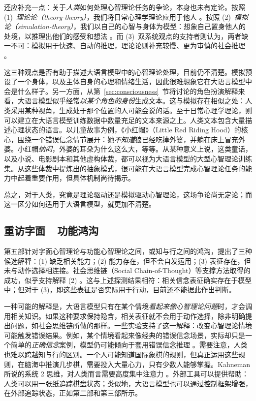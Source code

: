 还应补充一点：关于\emph{人类}如何处理心智理论任务的争论，本身也未有定论。按照 (1)~\emph{理论论（theory-theory）}，我们将日常心理学理论应用于他人 \citep{gopnik1992child}。按照 (2)~\emph{模拟论（simulation-theory）}，我们以自己的心智与身体为模型：想象自己置身他人的处境，以推理出他们的感受和想法 \citep{goldman2006simulating}。而 (3)~双系统观点的支持者则认为，两者缺一不可：模拟用于快速、自动的推理，理论论则补充较慢、更为审慎的社会推理 \citep{apperly2009humans}。

这三种观点是否有助于描述大语言模型中的心智理论处理，目前仍不清楚。模拟预设了一个身体，以及主体自身的心理和情绪生活，因此很难想象它在大语言模型中会是什么样子。另一方面，从第~\ref{sec:consciousness}~节将讨论的角色扮演解释来看，大语言模型似乎经常\emph{以某个角色的身份}生成文本。这与模拟存在相似之处：人类采用某种视角，生成处于那个位置的人可能会说的话。至于日常心理学理论，则可以建立在大语言模型训练数据中数量充足的文本来源之上。人类文本包含大量描述心理状态的语言。以儿童故事为例，《小红帽》（Little Red Riding Hood）的核心，围绕一个错误信念情节展开：她\emph{不知道}狼已经吃掉外婆，并躺在床上冒充外婆。小红帽\emph{纳闷}，外婆的耳朵为什么这么大，等等。从某种意义上说，这类童话，以及小说、电影剧本和其他虚构体裁，都可以视为大语言模型的大型心智理论训练集。从这些体裁中提炼出的抽象模式，很可能在大语言模型完成心智理论任务的能力中起着重要作用，但具体机制尚待揭示。

总之，对于人类，究竟是理论驱动还是模拟驱动心智理论，这场争论尚无定论；而这一区分如何适用于大语言模型，就更加不清楚。

\subsection{重访字面—功能鸿沟}
第五部针对字面心智理论与功能心智理论之间，或知与行之间的鸿沟，提出了三种候选解释：(1) 缺乏相关能力；(2) 能力存在，但不会自发运用；(3) 表征存在，但未与动作选择相连接。社会思维链（Social Chain-of-Thought）等支撑方法取得的成功，似乎支持解释 (2) \citep{akata2025playing}。这与上述探测结果相符：相关信念表征确实存在于模型中；但对于 (3)，即这些表征是否实际用于行动，目前还不能据此作出判断。

一种可能的解释是，大语言模型只有在某个情境\emph{看起来像心智理论问题}时，才会调用相关知识。如果这种要求保持隐含，相关表征就不会用于动作选择，除非明确提出问题，如社会思维链所做的那样。一些实验支持了这一解释：改变心智理论情境可能触发错误结果。例如，某个情境看起来像经典的错误信念场景，实际却只是一个简单的\emph{正确信念}案例，模型仍可能倾向于套用错误信念推理 \citep{ullman2023large, kouwenhoven2026traces}。需要注意，人类也难以跨越知与行的区别。一个人可能知道国际象棋的规则，但真正运用这些规则，在脑海中推演几步棋，需要投入大量心力，只有少数人能够掌握。Kahneman 所说的系统 2 思维，对人类而言需要高度集中注意力 \citep{kahneman2011thinking}。外部工具可以提供帮助：人类可以用一张纸追踪棋盘状态；类似地，大语言模型也可以通过控制框架增强，在外部追踪状态，正如第二部和第三部所示。

